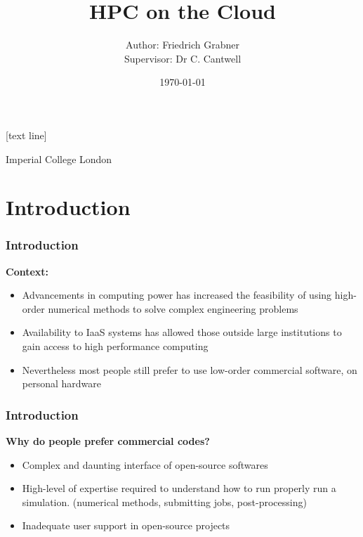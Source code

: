 \documentclass{beamer}
\begin{document}
[text line]{\parbox{\linewidth}{\vspace*{-8pt}\centering Imperial College London}
}
\title{\huge{HPC on the Cloud}} 
\author{Author: Friedrich Grabner\\
Supervisor: Dr C. Cantwell}
\date{\today} 

\begin{frame}
\titlepage
\end{frame}

\section{Introduction} 
\begin{frame}\frametitle{Introduction}
\textbf{Context:}
\begin{itemize}
\item Advancements in computing power has increased the feasibility of using high-order numerical methods to solve complex engineering problems
\item Availability to IaaS systems has allowed those outside large institutions to gain access to high performance computing
\end{itemize}
\vspace{.5cm}
\textbf{\color{red}{Problem:}}
\begin{itemize}
\item Nevertheless most people still prefer to use low-order commercial software, on personal hardware
\end{itemize}
\end{frame}

\begin{frame}\frametitle{Introduction}
\textbf{Why do people prefer commercial codes?}
\vspace{.5cm}
\begin{itemize}
\item Complex and daunting interface of open-source softwares
\item High-level of expertise required to understand how to run properly run a simulation. (numerical methods, submitting jobs, post-processing)
\item Inadequate user support in open-source projects
\end{itemize}
\end{frame}
\end{document}
